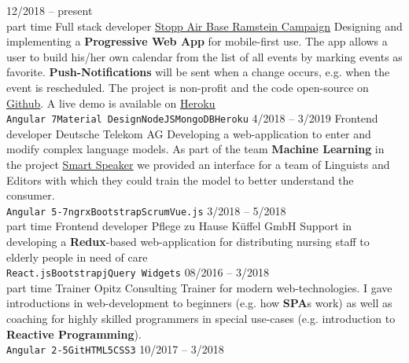 \documentclass[9pt]{developercv} %
\begin{document}
\begin{entrylist}
	\entry
		{12/2018 -- present\\\footnotesize{part time}}
		{Full stack developer}
		{\href{https://www.ramstein-kampagne.eu/}{Stopp Air Base Ramstein Campaign}}
    {
      Designing and implementing a \textbf{Progressive Web App} for mobile-first use. The app allows a user to build his/her own calendar from
      the list of all events by marking events as favorite. \textbf{Push-Notifications} will be sent when a change occurs, e.g. when the event is
      rescheduled. The project is non-profit and the code open-source on \underline{\href{https://github.com/frot-io/ramstein-conference-app}{Github}}.
      A live demo is available on \underline{\href{https://ramstein-conference-app.herokuapp.com/}{Heroku}}\\
      \texttt{Angular 7}\slashsep\texttt{Material Design}\slashsep\texttt{NodeJS}\slashsep\texttt{MongoDB}\slashsep\texttt{Heroku}
    }
  \entry
		{4/2018 -- 3/2019}
		{Frontend developer}
		{Deutsche Telekom AG}
    {
      Developing a web-application to enter and modify complex language models. As part of the team \textbf{Machine Learning} in the project
      \underline{\href{https://www.telekom.de/zuhause/geraete-und-zubehoer/smart-speaker}{Smart Speaker}} we provided an interface for a team
      of Linguists and Editors with which they could train the model to better understand the consumer.\\
      \texttt{Angular 5-7}\slashsep\texttt{ngrx}\slashsep\texttt{Bootstrap}\slashsep\texttt{Scrum}\slashsep\texttt{Vue.js}
    }
	\entry
		{3/2018 -- 5/2018\\\footnotesize{part time}}
		{Frontend developer}
		{Pflege zu Hause Küffel GmbH}
		{
      Support in developing a \textbf{Redux}-based web-application for distributing nursing staff to elderly people in need of care\\
      \texttt{React.js}\slashsep\texttt{Bootstrap}\slashsep\texttt{jQuery Widgets}
    }
  \entry
		{08/2016 -- 3/2018\\\footnotesize{part time}}
		{Trainer}
		{Opitz Consulting}
		{
      Trainer for modern web-technologies. I gave introductions in web-development to beginners (e.g. how \textbf{SPA}s work) as well as
      coaching for highly skilled programmers in special use-cases (e.g. introduction to \textbf{Reactive Programming}).\\
      \texttt{Angular 2-5}\slashsep\texttt{Git}\slashsep\texttt{HTML5}\slashsep\texttt{CSS3}
    }
  \entry
		{10/2017 -- 3/2018}

\end{entrylist}
\end{document}
